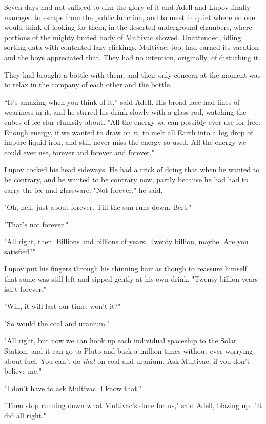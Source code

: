\documentclass[11pt]{article}
\newcommand{\q}[1]{\enquote{#1}}
\begin{document}
Seven days had not sufficed to dim the glory of it and Adell and Lupov finally managed to escape from the public function, and to meet in quiet where no one would think of looking for them, in the deserted underground chambers, where portions of the mighty buried body of Multivac showed. Unattended, idling, sorting data with contented lazy clickings, Multivac, too, had earned its vacation and the boys appreciated that. They had no intention, originally, of disturbing it.

They had brought a bottle with them, and their only concern at the moment was to relax in the company of each other and the bottle.

\q{It's amazing when you think of it,} said Adell. His broad face had lines of 
weariness in it, and he stirred his drink slowly with a glass rod, watching the cubes of ice slur clumsily about. "All the energy we can possibly ever use for free. Enough energy, if we wanted to draw on it, to melt all Earth into a big drop of impure liquid iron, and still never miss the energy so used. All the energy we could ever use, forever and forever and forever."

Lupov cocked his head sideways. He had a trick of doing that when he wanted to be contrary, and he wanted to be contrary now, partly because he had had to carry the ice and glassware. "Not forever," he said.

"Oh, hell, just about forever. Till the sun runs down, Bert."

"That's not forever."

"All right, then. Billions and billions of years. Twenty billion, maybe. Are you satisfied?"

Lupov put his fingers through his thinning hair as though to reassure himself that some was still left and sipped gently at his own drink. "Twenty billion years isn't forever."

"Will, it will last our time, won't it?"

"So would the coal and uranium."

"All right, but now we can hook up each individual spaceship to the Solar Station, and it can go to Pluto and back a million times without ever worrying about fuel. You can't do \textit{that} on coal and uranium. Ask Multivac, if you don't believe me."

"I don't have to ask Multivac. I know that."

"Then stop running down what Multivac's done for us," said Adell, blazing up. "It did all right."
\end{document}
